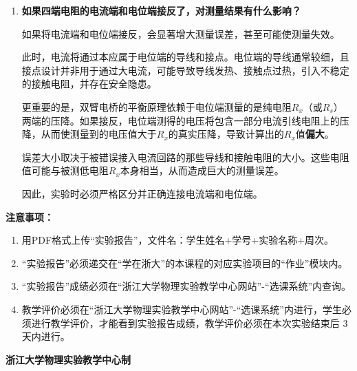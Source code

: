 \documentclass[10pt,a4paper]{ctexart}
\newcommand{\sihao}{\fontsize{14pt}{18pt}\selectfont}
\newcommand{\xiaosi}{\fontsize{12pt}{16pt}\selectfont}
\begin{document}
\begin{enumerate}
        \item \textbf{如果四端电阻的电流端和电位端接反了，对测量结果有什么影响？}
        
        如果将电流端和电位端接反，会显著增大测量误差，甚至可能使测量失效。

        此时，电流将通过本应属于电位端的导线和接点。电位端的导线通常较细，且接点设计并非用于通过大电流，可能导致导线发热、接触点过热，引入不稳定的接触电阻，并存在安全隐患。
        
        更重要的是，双臂电桥的平衡原理依赖于电位端测量的是纯电阻$R_x$（或$R_s$）两端的压降。如果接反，电位端测得的电压将包含一部分电流引线电阻上的压降，从而使测量到的电压值大于$R_x$的真实压降，导致计算出的$R_x$值\textbf{偏大}。
        
        误差大小取决于被错误接入电流回路的那些导线和接触电阻的大小。这些电阻值可能与被测低电阻$R_x$本身相当，从而造成巨大的测量误差。
        
        因此，实验时必须严格区分并正确连接电流端和电位端。
    \end{enumerate}

\newpage

\sihao\textbf{注意事项：}
\xiaosi
\begin{enumerate}
    \item 用PDF格式上传“实验报告”，文件名：学生姓名+学号+实验名称+周次。
    \item  “实验报告”必须递交在“学在浙大”的本课程的对应实验项目的“作业”模块内。
    \item  “实验报告”成绩必须在“浙江大学物理实验教学中心网站”-“选课系统”内查询。
    \item 教学评价必须在“浙江大学物理实验教学中心网站”-“选课系统”内进行，学生必须进行教学评价，才能看到实验报告成绩，教学评价必须在本次实验结束后 3 天内进行。
\end{enumerate}

\vspace{1cm}
\xiaosi\centering \textbf{浙江大学物理实验教学中心制}
\end{document}
